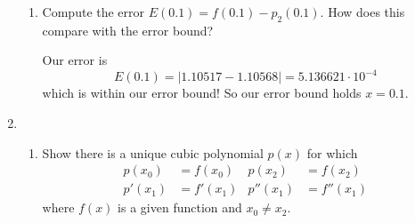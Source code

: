 \documentclass[a4paper,12pt]{article}
\newcommand{\abs}[1]{\left| #1 \right|}
\begin{document}
\begin{enumerate}[label = \arabic*.]
\begin{enumerate}[label = (\roman*)]
			\item Compute the error $ E(0.1) = f(0.1) - p_2(0.1) $. How does this compare with the error bound?
			
			Our error is
			\[
				E(0.1) = \abs{1.10517 - 1.10568} = 5.136621 \cdot 10^{-4}
			\]
			which is within our error bound! So our error bound holds $ x = 0.1 $.
		\end{enumerate}
	
	\newpage
	\item \
		\begin{enumerate}[label = (\roman*)]
			\item Show there is a unique cubic polynomial $ p(x) $ for which 
			\begin{align*}
				p(x_0)  &= f(x_0) & p(x_2)   &= f(x_2) \\
				p'(x_1) &= f'(x_1) & p''(x_1) &= f''(x_1)
			\end{align*}
			where $ f(x) $ is a given function and $ x_0 \neq x_2 $.
			

\end{enumerate}
\end{enumerate}
\end{document}
